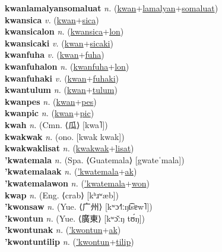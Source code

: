 \textbf{kwanlamalyansomaluat} \textit{n.} (\hyperref[kwan]{kwan}+\hyperref[lamalyan]{lamalyan}+\hyperref[somaluat]{somaluat})
 \label{kwanlamalyansomaluat} \\
\textbf{kwansica} \textit{v.} (\hyperref[kwan]{kwan}+\hyperref[sica]{sica})
 \label{kwansica} \\
\textbf{kwansicalon} \textit{n.} (\hyperref[kwansica]{kwansica}+\hyperref[lon]{lon})
 \label{kwansicalon} \\
\textbf{kwansicaki} \textit{v.} (\hyperref[kwan]{kwan}+\hyperref[sicaki]{sicaki})
 \label{kwansicaki} \\
\textbf{kwanfuha} \textit{v.} (\hyperref[kwan]{kwan}+\hyperref[fuha]{fuha})
 \label{kwanfuha} \\
\textbf{kwanfuhalon} \textit{n.} (\hyperref[kwanfuha]{kwanfuha}+\hyperref[lon]{lon})
 \label{kwanfuhalon} \\
\textbf{kwanfuhaki} \textit{v.} (\hyperref[kwan]{kwan}+\hyperref[fuhaki]{fuhaki})
 \label{kwanfuhaki} \\
\textbf{kwantulum} \textit{n.} (\hyperref[kwan]{kwan}+\hyperref[tulum]{tulum})
 \label{kwantulum} \\
\textbf{kwanpes} \textit{n.} (\hyperref[kwan]{kwan}+\hyperref[pes]{pes})
 \label{kwanpes} \\
\textbf{kwanpic} \textit{n.} (\hyperref[kwan]{kwan}+\hyperref[pic]{pic})
 \label{kwanpic} \\
\textbf{kwah} \textit{n.} (Cmn. ⟨瓜⟩ [kwa˥])
 \label{kwah} \\
\textbf{kwakwak} \textit{n.} (ono. [kwak kwak])
 \label{kwakwak} \\
\textbf{kwakwaklisat} \textit{n.} (\hyperref[kwakwak]{kwakwak}+\hyperref[lisat]{lisat})
 \label{kwakwaklisat} \\
\textbf{'kwatemala} \textit{n.} (Spa. ⟨Guatemala⟩ [gwateˈmala])
 \label{'kwatemala} \\
\textbf{'kwatemalaak} \textit{n.} (\hyperref['kwatemala]{'kwatemala}+\hyperref[ak]{ak})
 \label{'kwatemalaak} \\
\textbf{'kwatemalawon} \textit{n.} (\hyperref['kwatemala]{'kwatemala}+\hyperref[won]{won})
 \label{'kwatemalawon} \\
\textbf{kwap} \textit{n.} (Eng. ⟨crab⟩ [kʰɹʷæb])
 \label{kwap} \\
\textbf{'kwonsaw} \textit{n.} (Yue. ⟨广州⟩ [kʷɔ˧˥ːŋt͡sɐw˥])
 \label{'kwonsaw} \\
\textbf{'kwontun} \textit{n.} (Yue. ⟨廣東⟩ [kʷɔ̌ːŋ tʊ́ŋ])
 \label{'kwontun} \\
\textbf{'kwontunak} \textit{n.} (\hyperref['kwontun]{'kwontun}+\hyperref[ak]{ak})
 \label{'kwontunak} \\
\textbf{'kwontuntilip} \textit{n.} (\hyperref['kwontun]{'kwontun}+\hyperref[tilip]{tilip})
 \label{'kwontuntilip} \\
